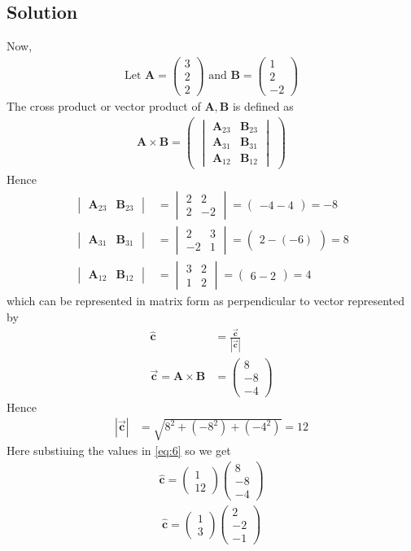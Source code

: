\documentclass[12pt]{article}
\newcommand{\mydet}[1]{\ensuremath{\begin{vmatrix}#1\end{vmatrix}}}
\providecommand{\abs}[1]{\left\vert#1\right\vert}
\newcommand{\myvec}[1]{\ensuremath{\begin{pmatrix}#1\end{pmatrix}}}
\let\vec\mathbf
\begin{document}
\begin{enumerate}
\section{Solution}
Now,
\begin{align}
\text{Let } \vec{A} = \myvec{3\\2\\2} \text{ and } \vec{B} = \myvec{1\\ 2 \\ -2}
\end{align}
The cross product or vector product of $\vec{A},\vec{B}$ is defined as
\begin{align}
 \vec{A} \times \vec{B} = \myvec{\mydet{\vec{A}_{23}&\vec{B}_{23}\\\vec{A}_{31}&\vec{B}_{31}\\\vec{A}_{12}&\vec{B}_{12}}}
\end{align}
Hence
\begin{align}
 \mydet{\vec{A}_{23}&\vec{B}_{23}}&=\mydet{2&2\\2&-2}=\myvec{-4-4}=-8\\
 \mydet{\vec{A}_{31}&\vec{B}_{31}}&=\mydet{2&3\\-2&1}=\myvec{2-(-6)}=8\\
 \mydet{\vec{A}_{12}&\vec{B}_{12}}&=\mydet{3&2\\1&2}=\myvec{6-2}=4
\end{align}
which can be represented in matrix form as
perpendicular to vector represented by
\\
\begin{align}
\hat{\vec{c}} &=\frac{\overrightarrow{\vec{c}}}{\abs{\overrightarrow{\vec{c}}}} \label{eq:6}\\
\overrightarrow{\vec{c}}=\vec{A} \times \vec{B}&=\myvec{8\\-8\\-4} 
\end{align}
Hence
\begin{align}
\abs{\overrightarrow{\vec{c}}}&={\sqrt{8^2+(-8^2)+(-4^2)}}=12  
\end{align}
Here substiuing the values in \eqref{eq:6} so we get
\begin{align}
\hat{\vec{c}}=\myvec{1\\12}\myvec{8\\-8\\-4}
\end{align}
\begin{align}
\hat{\vec{c}}=\myvec{1\\3}\myvec{2\\-2\\-1}
\end{align}
\end{enumerate}
\end{document}
